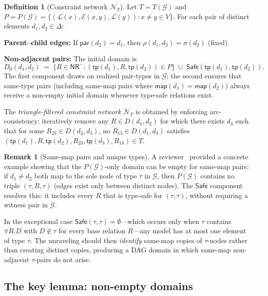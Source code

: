 \documentclass[a4paper,11pt]{article}
\theoremstyle{definition}
\newtheorem{definition}[theorem]{Definition}
\newtheorem{remark}[theorem]{Remark}
\newcommand{\tp}{\ensuremath{\mathsf{tp}}}
\newcommand{\NR}{\ensuremath{\mathsf{NR}}}
\newcommand{\Safe}{\ensuremath{\mathsf{Safe}}}
\newcommand{\GG}{\ensuremath{\mathcal{G}}}
\newcommand{\LL}{\ensuremath{\mathcal{L}}}
\newcommand{\EE}{\ensuremath{\mathcal{E}}}
\newcommand{\NN}{\ensuremath{\mathcal{N}}}
\begin{document}
\begin{definition}[Constraint network $\NN_T$]\label{def:network}
Let $T = T(\GG)$ and $P = P(\GG) = \{(\LL(x), \EE(x,y), \LL(y))
: x \neq y \in V\}$.  For each pair of distinct elements
$d_1, d_2 \in \Delta$:

\medskip\noindent\textbf{Parent--child edges:}\;
If $\mathsf{par}(d_2) = d_1$, then $\rho(d_1, d_2) = \sigma(d_2)$
(fixed).

\medskip\noindent\textbf{Non-adjacent pairs:}\;
The initial domain is
\[
D_0(d_1, d_2) \;=\; \{R \in \NR^{-} : (\tp(d_1), R,
\tp(d_2)) \in P\} \;\cup\; \Safe(\tp(d_1), \tp(d_2)).
\]
The first component draws on realized pair-types in $\GG$;
the second ensures that same-type pairs (including same-map
pairs where $\mathsf{map}(d_1) = \mathsf{map}(d_2)$) always
receive a non-empty initial domain whenever type-safe relations
exist.

\medskip
The \emph{triangle-filtered constraint network} $\NN_T$ is
obtained by enforcing arc-consistency: iteratively remove any
$R \in D(d_1, d_2)$ for which there exists $d_3$ such that for
some $R_{23} \in D(d_2, d_3)$, no $R_{13} \in D(d_1, d_3)$
satisfies
$(\tp(d_1), R, \tp(d_2), R_{23}, \tp(d_3), R_{13}) \in T$.
\end{definition}

\begin{remark}[Same-map pairs and unique types]
\label{rem:same-map-domain}
A reviewer~\cite{GPTReview2} provided a concrete example
showing that the $P(\GG)$-only domain can be empty for
same-map pairs: if $d_1 \neq d_2$ both map to the sole
node of type $\tau$ in $\GG$, then $P(\GG)$ contains no
triple $(\tau, R, \tau)$ (edges exist only between distinct
nodes).  The $\Safe$ component resolves this: it includes
every $R$ that is type-safe for $(\tau, \tau)$, without
requiring a witness pair in $\GG$.

In the exceptional case $\Safe(\tau, \tau) = \emptyset$---which
occurs only when $\tau$ contains $\forall R.D$ with
$D \notin \tau$ for every base relation $R$---any model has at
most one element of type $\tau$.  The unraveling should then
\emph{identify} same-map copies of $\tau$-nodes rather than
creating distinct copies, producing a DAG domain in which same-map
non-adjacent $\tau$-pairs do not arise.
\end{remark}

\subsection{The key lemma: non-empty domains}
\label{sec:key-lemma}
\end{document}

